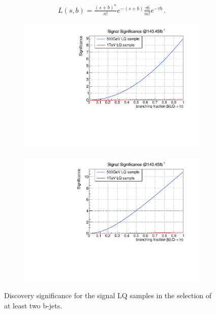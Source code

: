 \begin{align}
                L(s,b)=\frac{(s+b)^n}{n!}e^{-(s+b)}\frac{\tau b}{m!}e^{-\tau b}\,\text{.}
\label{likelihoodfunction}
\end{align}
%
\begin{figure}
  \centering
                \begin{subfigure}[t]{0.49\textwidth}
                \includegraphics[width=\textwidth]{figures/plots/Significance/2b-jet_1tau.pdf}
                \label{Significance:2b1tau}
                \end{subfigure}
                \begin{subfigure}[t]{0.49\textwidth}
                \includegraphics[width=\textwidth]{figures/plots/Significance/2b-jet_2tau.pdf}
                \label{Significance:2b2tau}
                \end{subfigure}
\caption[Discovery significance for the signal LQ samples in the selection of at least two b-jets.]{Discovery significance for the signal LQ samples in the selection of at least two b-jets.}
\label{Significance:2b}
\end{figure}
